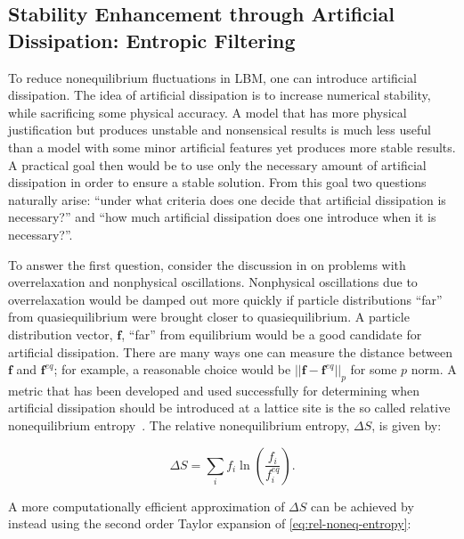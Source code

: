 \documentclass[pdftex,ms]{pittetd}
\begin{document}
\subsection{Stability Enhancement through Artificial Dissipation: Entropic Filtering}

To reduce nonequilibrium fluctuations in LBM, one can introduce artificial dissipation.
The idea of artificial dissipation is to increase numerical stability, while sacrificing some physical accuracy.
A model that has more physical justification but produces unstable and nonsensical results is much less useful than a model with some minor artificial features yet produces more stable results.
A practical goal then would be to use only the necessary amount of artificial dissipation in order to ensure a stable solution.
From this goal two questions naturally arise: ``under what criteria does one decide that artificial dissipation is necessary?'' and ``how much artificial dissipation does one introduce when it is necessary?''.

To answer the first question, consider the discussion in  on problems with overrelaxation and nonphysical oscillations.
Nonphysical oscillations due to overrelaxation would be damped out more quickly if particle distributions ``far'' from quasiequilibrium were brought closer to quasiequilibrium.
A particle distribution vector, $\mathbf{f}$, ``far'' from equilibrium would be a good candidate for artificial dissipation.
There are many ways one can measure the distance between $\mathbf{f}$ and $\mathbf{f}^{eq}$; for example, a reasonable choice would be $||\mathbf{f} - \mathbf{f}^{eq}||_p$ for some $p$ norm.
A metric that has been developed and used successfully for determining when artificial dissipation should be introduced at a lattice site is the so called relative nonequilibrium entropy~\cite{gorban2014enhancement,brownlee2006stabilization,brownlee2007stability,brownlee2008nonequilibrium,packwood2009entropy}.
The relative nonequilibrium entropy, $\Delta S$, is given by:

\begin{equation} \label{eq:rel-noneq-entropy}
\Delta S = \sum_i f_i \ln(\frac{f_i}{f^{eq}_i}).
\end{equation}

\noindent A more computationally efficient approximation of $\Delta S$ can be achieved by instead using the second order Taylor expansion of \eqref{eq:rel-noneq-entropy}:
\end{document}
